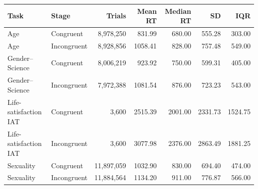 \begin{tabular}{@{}llrrrrr@{}}
\toprule
Task & Stage & Trials & Mean RT & Median RT & SD & IQR \\
\midrule
Age & Congruent & 8,978,250 & 831.99 & 680.00 & 555.28 & 303.00 \\
Age & Incongruent & 8,928,856 & 1058.41 & 828.00 & 757.48 & 549.00 \\
Gender--Science & Congruent & 8,006,219 & 923.92 & 750.00 & 599.31 & 405.00 \\
Gender--Science & Incongruent & 7,972,388 & 1081.54 & 876.00 & 723.23 & 543.00 \\
Life-satisfaction IAT & Congruent & 3,600 & 2515.39 & 2001.00 & 2331.73 & 1524.75 \\
Life-satisfaction IAT & Incongruent & 3,600 & 3077.98 & 2376.00 & 2863.49 & 1881.25 \\
Sexuality & Congruent & 11,897,059 & 1032.90 & 830.00 & 694.40 & 474.00 \\
Sexuality & Incongruent & 11,884,564 & 1134.20 & 911.00 & 776.87 & 566.00 \\
\bottomrule
\end{tabular}
